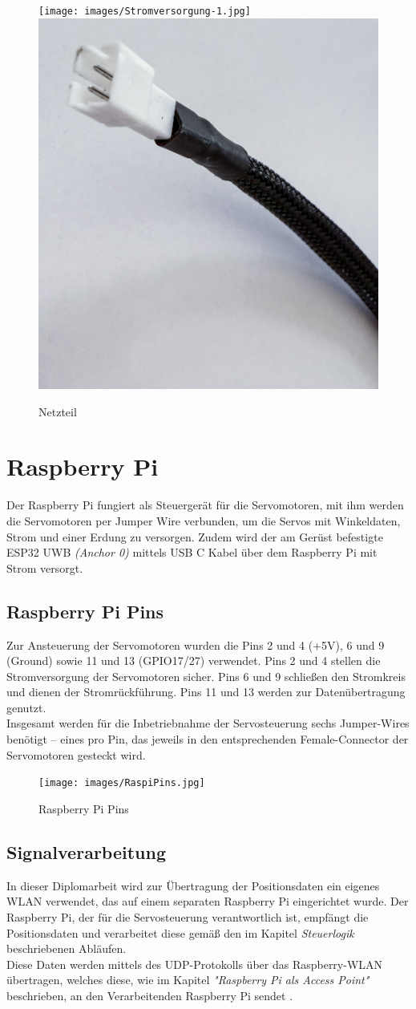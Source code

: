 \begin{figure}[H]
	\centering
	\texttt{[image: images/Stromversorgung-1.jpg]}
	\includegraphics[width=0.4\linewidth]{images/Stromversorgung-2.jpg}
	\caption[Netzteil]{Netzteil}
	\label{fig:Netzteil}
\end{figure}

\section{Raspberry Pi}
Der Raspberry Pi fungiert als Steuergerät für die Servomotoren, mit ihm werden die Servomotoren per Jumper Wire verbunden, um die Servos mit Winkeldaten, Strom und einer Erdung zu versorgen. Zudem wird der am Gerüst befestigte ESP32 UWB \textit{(Anchor 0)} mittels USB C Kabel über dem Raspberry Pi mit Strom versorgt. 

\subsection{Raspberry Pi Pins}
Zur Ansteuerung der Servomotoren wurden die Pins 2 und 4 (+5V), 6 und 9 (Ground) sowie 11 und 13 (GPIO17/27) verwendet. Pins 2 und 4 stellen die Stromversorgung der Servomotoren sicher. Pins 6 und 9 schließen den Stromkreis und dienen der Stromrückführung. Pins 11 und 13 werden zur Datenübertragung genutzt.\\
Insgesamt werden für die Inbetriebnahme der Servosteuerung sechs Jumper-Wires benötigt – eines pro Pin, das jeweils in den entsprechenden Female-Connector der Servomotoren gesteckt wird.

\begin{figure}[H]
	\centering
	\texttt{[image: images/RaspiPins.jpg]}
	\caption[Raspberry Pi Pins]{Raspberry Pi Pins}
	\label{fig: Raspberry Pi Pins}
\end{figure}


\subsection{Signalverarbeitung}
In dieser Diplomarbeit wird zur Übertragung der Positionsdaten ein eigenes WLAN verwendet, das auf einem separaten Raspberry Pi eingerichtet wurde. Der Raspberry Pi, der für die Servosteuerung verantwortlich ist, empfängt die Positionsdaten und verarbeitet diese gemäß den im Kapitel \textit{Steuerlogik} beschriebenen Abläufen. \\
Diese Daten werden mittels des UDP-Protokolls über das Raspberry-WLAN übertragen, welches diese, wie im Kapitel \textit{"Raspberry Pi als Access Point"} beschrieben, an den Verarbeitenden Raspberry Pi sendet	.

